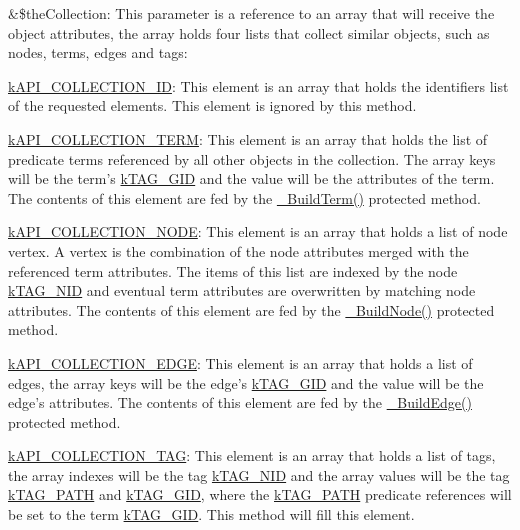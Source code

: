\begin{DoxyItemize}
\item {\ttfamily \&\$the\-Collection}\-: This parameter is a reference to an array that will receive the object attributes, the array holds four lists that collect similar objects, such as nodes, terms, edges and tags\-: 
\begin{DoxyItemize}
\item {\ttfamily \hyperlink{}{k\-A\-P\-I\-\_\-\-C\-O\-L\-L\-E\-C\-T\-I\-O\-N\-\_\-\-I\-D}}\-: This element is an array that holds the identifiers list of the requested elements. This element is ignored by this method. 
\item {\ttfamily \hyperlink{}{k\-A\-P\-I\-\_\-\-C\-O\-L\-L\-E\-C\-T\-I\-O\-N\-\_\-\-T\-E\-R\-M}}\-: This element is an array that holds the list of predicate terms referenced by all other objects in the collection. The array keys will be the term's \hyperlink{}{k\-T\-A\-G\-\_\-\-G\-I\-D} and the value will be the attributes of the term. The contents of this element are fed by the \hyperlink{class_c_ontology_wrapper_a7d37edd771ffa60b36ead632c2e46534}{\-\_\-\-Build\-Term()} protected method. 
\item {\ttfamily \hyperlink{}{k\-A\-P\-I\-\_\-\-C\-O\-L\-L\-E\-C\-T\-I\-O\-N\-\_\-\-N\-O\-D\-E}}\-: This element is an array that holds a list of node vertex. A vertex is the combination of the node attributes merged with the referenced term attributes. The items of this list are indexed by the node \hyperlink{}{k\-T\-A\-G\-\_\-\-N\-I\-D} and eventual term attributes are overwritten by matching node attributes. The contents of this element are fed by the \hyperlink{class_c_ontology_wrapper_a3149d34bb488513db2d572f3002bebce}{\-\_\-\-Build\-Node()} protected method. 
\item {\ttfamily \hyperlink{}{k\-A\-P\-I\-\_\-\-C\-O\-L\-L\-E\-C\-T\-I\-O\-N\-\_\-\-E\-D\-G\-E}}\-: This element is an array that holds a list of edges, the array keys will be the edge's \hyperlink{}{k\-T\-A\-G\-\_\-\-G\-I\-D} and the value will be the edge's attributes. The contents of this element are fed by the \hyperlink{}{\-\_\-\-Build\-Edge()} protected method. 
\item {\ttfamily \hyperlink{}{k\-A\-P\-I\-\_\-\-C\-O\-L\-L\-E\-C\-T\-I\-O\-N\-\_\-\-T\-A\-G}}\-: This element is an array that holds a list of tags, the array indexes will be the tag \hyperlink{}{k\-T\-A\-G\-\_\-\-N\-I\-D} and the array values will be the tag \hyperlink{}{k\-T\-A\-G\-\_\-\-P\-A\-T\-H} and \hyperlink{}{k\-T\-A\-G\-\_\-\-G\-I\-D}, where the \hyperlink{}{k\-T\-A\-G\-\_\-\-P\-A\-T\-H} predicate references will be set to the term \hyperlink{}{k\-T\-A\-G\-\_\-\-G\-I\-D}. This method will fill this element. 

\end{DoxyItemize}
\end{DoxyItemize}
